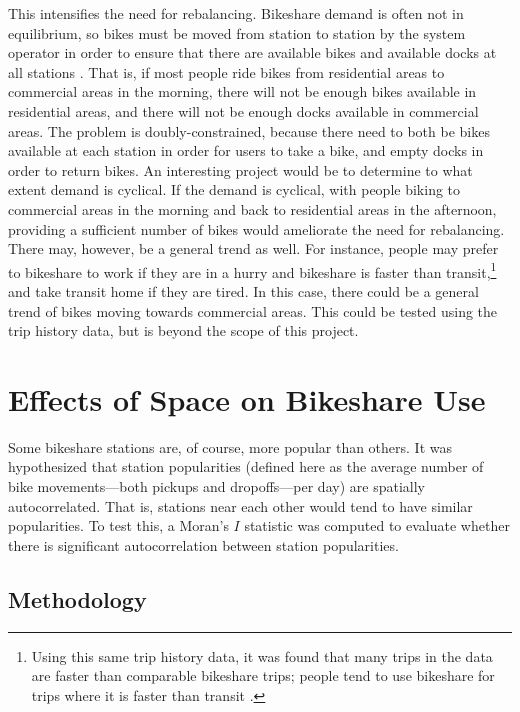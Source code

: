 \documentclass[letterpaper,11pt]{article}
\begin{document}
This intensifies the need for rebalancing. Bikeshare demand is often
not in equilibrium, so bikes must be moved from station to station by
the system operator in order to ensure that there are available bikes
and available docks at all stations \autocite[108]{IDAE2007}. That is,
if most people ride bikes from residential areas to commercial areas
in the morning, there will not be enough bikes available in
residential areas, and there will not be enough docks available in
commercial areas. The problem is doubly-constrained, because there
need to both be bikes available at each station in order for users to
take a bike, and empty docks in order to return bikes. An interesting
project would be to determine to what extent demand is cyclical. If
the demand is cyclical, with people biking to commercial areas in the
morning and back to residential areas in the afternoon, providing a
sufficient number of bikes would ameliorate the need for rebalancing.
There may, however, be a general trend as well. For instance, people
may prefer to bikeshare to work if they are in a hurry and bikeshare
is faster than transit,\footnote{Using this same trip history data, it
  was found that many trips in the data are faster than comparable
  bikeshare trips; people tend to use bikeshare for trips where it is
  faster than transit \autocite{Wong2012}.} and take transit
home if they are tired. In this case, there could be a general trend
of bikes moving towards commercial areas. This could be tested using
the trip history data, but is beyond the scope of this project.

\section{Effects of Space on Bikeshare Use}

Some bikeshare stations are, of course, more popular than others. It
was hypothesized that station popularities (defined here as the
average number of bike movements---both pickups and dropoffs---per
day) are spatially autocorrelated. That is, stations near each other
would tend to have similar popularities. To test this, a Moran's $I$
statistic was computed to evaluate whether there is significant
autocorrelation between station popularities.

\subsection{Methodology}
\end{document}
